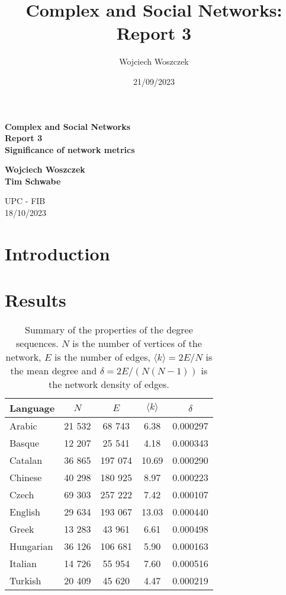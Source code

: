 \documentclass{article}
\title{Complex and Social Networks:\\
Report 3}
\author{Wojciech Woszczek}
\date{21/09/2023}
\begin{document}
\begin{titlepage}
    \begin{center}
        \vspace*{1cm}
            
        \LARGE
        \textbf{Complex and Social Networks\\
Report 3\\
Significance of network metrics}
            
        \vspace{5.5cm}
        \Large
        \textbf{Wojciech Woszczek} \\
        \textbf{Tim Schwabe} 
        
            
        \vspace{0.8cm}
            
        \Large
        UPC - FIB\\
        18/10/2023
            
    \end{center}
\end{titlepage}
\clearpage

\section{Introduction}



\section{Results}


\begin{table}[ht]
\centering
\begin{tabular}{lcccc}
\hline
Language & $N$ & $E$ & $ \langle k \rangle $ & $\delta$ \\
\hline
Arabic & 21 532 & 68 743 & 6.38 & 0.000297  \\
Basque  & 12 207 & 25 541 & 4.18 & 0.000343  \\
Catalan  & 36 865 & 197 074 & 10.69 & 0.000290  \\
Chinese  & 40 298 & 180 925 & 8.97 & 0.000223 \\
Czech  & 69 303 & 257 222 & 7.42 & 0.000107 \\
English & 29 634 & 193 067 & 13.03 & 0.000440 \\
Greek  & 13 283 & 43 961 & 6.61 & 0.000498 \\
Hungarian  & 36 126 & 106 681 & 5.90 & 0.000163 \\
Italian  & 14 726 & 55 954 & 7.60 & 0.000516 \\
Turkish  & 20 409 & 45 620 & 4.47 & 0.000219 \\
\hline
\end{tabular}
\caption{Summary of the properties of the degree sequences. $N$ is the number
of vertices of the network, $E$ is the number of edges, $ \langle k \rangle = 2E/N$ is the mean
degree and $\delta = 2E / (N (N-1))$ is the network density of edges.}
\label{networks_summary}
\end{table}
\end{document}
